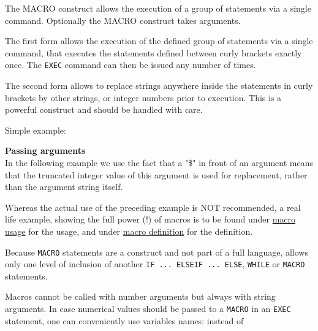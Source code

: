 The MACRO construct allows the execution of a group of statements via a
single command. Optionally the MACRO construct takes arguments.


The first form allows the execution of the defined group of statements via a
single command,  
that executes the statements defined between curly brackets exactly
once. The {\tt EXEC} command can then be issued any number of times.  

The second form allows to replace strings anywhere inside the statements
in curly brackets by other strings, or integer numbers prior to
execution. This is a powerful construct and should be handled with care.  

Simple example: 


{\bf Passing arguments}\\
In the following example we use the fact that a "\$" in front of an
argument means that the truncated integer value of this argument is used
for replacement, rather than the argument string itself.  


Whereas the actual use of the preceding example is NOT recommended,
a real life example, showing the full power (!) of macros is to be
found under \href{foot.html}{macro usage} for the usage, and
under \href{foot.html#macro}{macro definition} for the
definition.


Because {\tt MACRO} statements are a \madx
construct and not part of a full language, \madx  allows only one level
of inclusion of another {\tt IF ... ELSEIF ... ELSE}, {\tt WHILE}
or {\tt MACRO} statements.  


Macros cannot be called with number arguments but always with string
arguments. In case numerical values should be passed to a {\tt MACRO} in an
{\tt EXEC} statement, one can conveniently use variables names: 
instead of 




